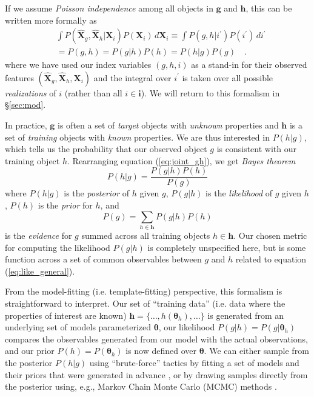 \documentclass[a4paper,fleqn,usenatbib,english]{mnras}
\begin{document}
If we assume \textit{Poisson independence} among all objects in $\mathbf{g}$ and $\mathbf{h}$, this can be written more formally as
\begin{align}
&\int P(\mathbf{\hat{X}}_g,\mathbf{\hat{X}}_h|\mathbf{X}_i) P(\mathbf{X}_i) \, d\mathbf{X}_i \equiv \int P(g,h|i^\prime) P(i^\prime) \, di^\prime \label{eq:like_general} \\ 
&= P(g,h) = P(g|h)P(h) = P(h|g)P(g) \quad . \label{eq:joint_gh}
\end{align}
where we have used our index variables $(g,h,i)$ as a stand-in for their observed features $(\mathbf{\hat{X}}_g,\mathbf{\hat{X}}_h,\mathbf{X}_i)$ and the integral over $i^\prime$ is taken over all possible \textit{realizations} of $i$ (rather than all $i \in \mathbf{i}$). We will return to this formalism in \S\ref{sec:mod}.

In practice, $\mathbf{g}$ is often a set of \textit{target} objects with \textit{unknown} properties and $\mathbf{h}$ is a set of \textit{training} objects with \textit{known} properties. We are thus interested in $P(h|g)$, which tells us the probability that our observed object $g$ is consistent with our training object $h$. Rearranging equation (\ref{eq:joint_gh}), we get \textit{Bayes theorem}
\begin{equation}
P(h|g)=\frac{P(g|h)P(h)}{P(g)}
\end{equation}
where $P(h|g)$ is the \textit{posterior} of $h$ given $g$, $P(g|h)$ is the \textit{likelihood} of $g$ given $h$, $P(h)$ is the \textit{prior} for $h$, and
\begin{equation}
P(g)=\sum_{h \in \mathbf{h}} P(g|h)P(h)
\end{equation}
is the \textit{evidence} for $g$ summed across all training objects $h \in \mathbf{h}$. Our chosen metric for computing the likelihood $P(g|h)$ is completely unspecified here, but is some function across a set of common observables between $g$ and $h$ related to equation (\ref{eq:like_general}).

From the model-fitting (i.e. template-fitting) perspective, this formalism is straightforward to interpret. Our set of ``training data'' (i.e. data where the properties of interest are known) $\mathbf{h}=\lbrace \ldots,h(\boldsymbol{\theta}_h),\ldots \rbrace$  is generated from an underlying set of models parameterized $\boldsymbol{\theta}$, our likelihood $P(g|h)=P(g|\boldsymbol{\theta}_h)$ compares the observables generated from our model with the actual observations, and our prior $P(h)=P(\boldsymbol{\theta}_h)$ is now defined over $\boldsymbol{\theta}$. We can either sample from the posterior $P(h|g)$ using ``brute-force'' tactics by fitting a set of models and their priors that were generated in advance \citep{ilbert+06,moustakas+13}, or by drawing samples directly from the posterior using, e.g., Markov Chain Monte Carlo (MCMC) methods \citep{acquaviva+11,johnson+13,speagle+16}.
\end{document}
